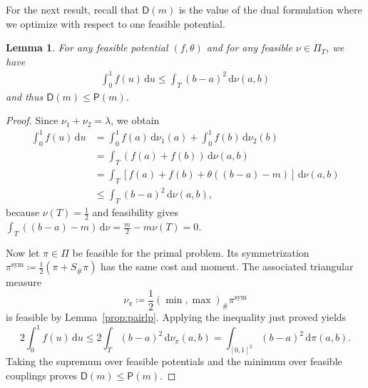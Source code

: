 \documentclass{article}
\newtheorem{lemma}[theorem]{Lemma}
\newcommand{\de}{\mathrm{\,d}}
\newcommand{\lam}{\lambda}
\begin{document}
For the next result, recall that \(\mathsf{D}(m)\) is the value of the dual formulation where we optimize with respect to one feasible potential.

\begin{lemma}\label{lem_opt}
    For any feasible potential \((f,\theta)\) and for any feasible \(\nu\in \Pi_T\), we have
    \begin{align}\label{eq_lem_dualineq}
        \int_0^1 f(u) \de u \leq \int_T (b-a)^2 \de \nu(a,b)
    \end{align}
    and thus \(\mathsf{D}(m) \leq \mathsf{P}(m)\).
\end{lemma}

\begin{proof}
    Since \(\nu_1+\nu_2=\lam\), we obtain
\begin{align*}
    \int_0^1 f(u) \de u &= \int_0^1 f(a) \de \nu_1(a) + \int_0^1 f(b) \de \nu_2(b) \\
    &= \int_T (f(a) + f(b)) \de \nu(a,b) \\
    &= \int_T \left[ f(a) + f(b) + \theta\left((b-a) - m\right)\right] \de \nu(a,b)\\
    &\leq \int_T (b-a)^2 \de \nu(a,b),
\end{align*}
because \(\nu(T)=\tfrac12\) and feasibility gives \(\int_T((b-a)-m)\de\nu=\tfrac m2-m\nu(T)=0\).

Now let \(\pi\in\Pi\) be feasible for the primal problem.
Its symmetrization \(\pi^{\mathrm{sym}}\coloneqq\tfrac12(\pi+S_\#\pi)\) has the same cost and moment.
The associated triangular measure
\[
    \nu_\pi\coloneqq
    \frac12(\min,\max)_\#\pi^{\mathrm{sym}}
\]
is feasible by Lemma~\ref{prop:pairlp}.
Applying the inequality just proved yields
\[
    2\int_0^1f(u)\de u
    \leq
    2\int_T(b-a)^2\de\nu_\pi(a,b)
    =
    \int_{[0,1]^2}(b-a)^2\de\pi(a,b).
\]
Taking the supremum over feasible potentials and the minimum over feasible couplings proves \(\mathsf D(m)\leq\mathsf P(m)\).
\end{proof}
\end{document}
